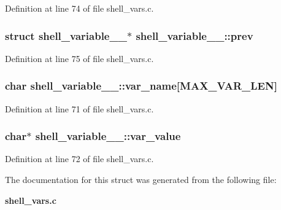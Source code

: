 Definition at line 74 of file shell\_\-vars.c.
\subsubsection[{prev}]{\setlength{\rightskip}{0pt plus 5cm}struct {\bf shell\_\-variable\_\-\_\-}$\ast$ {\bf shell\_\-variable\_\-\_\-::prev}\hspace{0.3cm}{\ttfamily  [read]}}\label{structshell__variable_____a9879e881df74561b574d56c45814d3f3}


Definition at line 75 of file shell\_\-vars.c.
\subsubsection[{var\_\-name}]{\setlength{\rightskip}{0pt plus 5cm}char {\bf shell\_\-variable\_\-\_\-::var\_\-name}[MAX\_\-VAR\_\-LEN]}\label{structshell__variable_____a4762c0a19f41db96e04d416d1cb58c21}


Definition at line 71 of file shell\_\-vars.c.
\subsubsection[{var\_\-value}]{\setlength{\rightskip}{0pt plus 5cm}char$\ast$ {\bf shell\_\-variable\_\-\_\-::var\_\-value}}\label{structshell__variable_____a529321e06f79480c4b0c485ef71442da}


Definition at line 72 of file shell\_\-vars.c.

The documentation for this struct was generated from the following file:\begin{DoxyCompactItemize}
\item 
{\bf shell\_\-vars.c}\end{DoxyCompactItemize}
